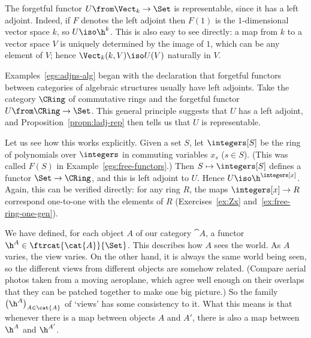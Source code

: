 \begin{example}
The forgetful functor $U\from \Vect_k \to \Set$ is representable,\linebreak
since it has a left adjoint.%
%
%
Indeed, if $F$ denotes the left adjoint then $F(1)$ is the $1$-dimensional
vector space $k$, so $U \iso \h^k$.  This is also easy to see directly: a
map from $k$ to a vector space $V$ is uniquely determined by the image of
$1$, which can be any element of $V$; hence $\Vect_k(k, V) \iso U(V)$
naturally in $V$.
\end{example}

\begin{example}
\label{eg:ladj-rep-ring}
Examples~\ref{egs:adjns-alg} began with the declaration that forgetful%
%
%
functors between categories of algebraic structures usually have left
adjoints.  Take the category $\CRing$ of commutative rings%
%
%
and the forgetful functor $U\from \CRing \to \Set$.  This general principle
suggests that $U$ has a left adjoint, and Proposition~\ref{propn:ladj-rep}
then tells us that $U$ is representable.

Let us see how this works explicitly.  Given a set $S$, let $\integers[S]$
be the ring of polynomials%
%
%
over $\integers$ in commuting variables $x_s$ ($s \in S$).  (This was
called $F(S)$ in Example~\ref{egs:free-functors}.)  Then
$S \mapsto \integers[S]$ defines a functor $\Set \to \CRing$, and this is
left adjoint to $U$.  Hence $U \iso \h^{\integers[x]}$.  Again, this
can be verified directly: for any ring $R$, the maps $\integers[x] \to R$
correspond one-to-one with the elements of $R$ (Exercises~\ref{ex:Zx}
and~\ref{ex:free-ring-one-gen}).
%
\end{example}

We have defined, for each object $A$ of our category $\cat{A}$, a functor
$\h^A \in \ftrcat{\cat{A}}{\Set}$.  This describes how $A$ sees the world.
As $A$ varies, the view varies.  On the other hand, it is always the same
world being seen, so the different views from different objects are somehow
related.  (Compare aerial%
%
%
photos taken from a moving aeroplane, which agree well enough on their
overlaps that they can be patched together to make one big picture.)  So
the family $\bigl(\h^A\bigr)_{A \in \cat{A}}$ of `views' has some
consistency to it.  What this means is that whenever there is a map between
objects $A$ and $A'$, there is also a map between $\h^A$ and $\h^{A'}$.

